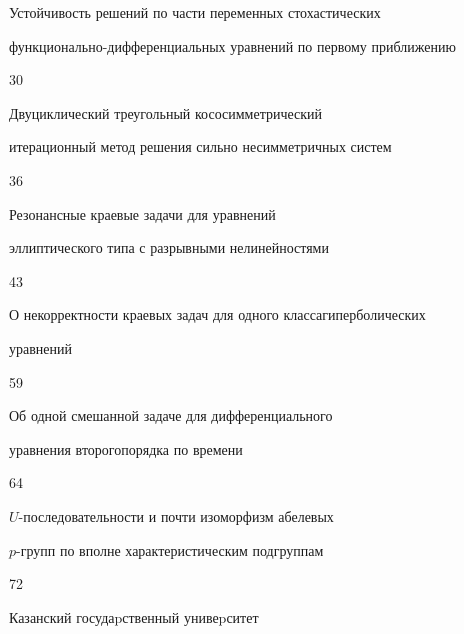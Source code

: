 {Устойчивость решений по части переменных стохастических \newline


функционально-дифференциальных уравнений по первому приближению}{30}




{Двуциклический треугольный кососимметрический \newline


итерационный метод решения сильно несимметричных систем}{36}




{Резонансные краевые задачи для уравнений \newline


эллиптического типа с разрывными нелинейностями}{43}




{О некорректности краевых задач для одного класса\newline гиперболических


уравнений}{59}




{Об одной смешанной задаче для дифференциального 


уравнения второго\newline порядка по времени}{64}




{$U$-последовательности и почти изоморфизм абелевых\newline


$p$-групп по вполне характеристическим подгруппам}{72}








\vfill


\noindent\raisebox{2pt}{\copyright} Казанский госудаpственный унивеpситет





